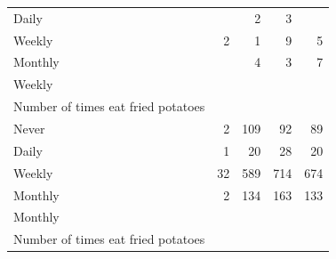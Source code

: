 \documentclass{article}
\begin{document}
\begin{table}[!h]
{\begin{tabular}{lllll}
			\multicolumn{1}{l}{\hspace{5em}Daily} &
			\multicolumn{1}{|r}{} &
			\multicolumn{1}{r}{2} &
			\multicolumn{1}{r}{3} &
			\multicolumn{1}{r}{} \\
			\multicolumn{1}{l}{\hspace{5em}Weekly} &
			\multicolumn{1}{|r}{2} &
			\multicolumn{1}{r}{1} &
			\multicolumn{1}{r}{9} &
			\multicolumn{1}{r}{5} \\
			\multicolumn{1}{l}{\hspace{5em}Monthly} &
			\multicolumn{1}{|r}{} &
			\multicolumn{1}{r}{4} &
			\multicolumn{1}{r}{3} &
			\multicolumn{1}{r}{7} \\
			\multicolumn{1}{l}{\hspace{3em}Weekly} &
			\multicolumn{1}{|r}{} &
			\multicolumn{1}{r}{} &
			\multicolumn{1}{r}{} &
			\multicolumn{1}{r}{} \\
			\multicolumn{1}{l}{\hspace{4em}Number of times eat fried potatoes} &
			\multicolumn{1}{|r}{} &
			\multicolumn{1}{r}{} &
			\multicolumn{1}{r}{} &
			\multicolumn{1}{r}{} \\
			\multicolumn{1}{l}{\hspace{5em}Never} &
			\multicolumn{1}{|r}{2} &
			\multicolumn{1}{r}{109} &
			\multicolumn{1}{r}{92} &
			\multicolumn{1}{r}{89} \\
			\multicolumn{1}{l}{\hspace{5em}Daily} &
			\multicolumn{1}{|r}{1} &
			\multicolumn{1}{r}{20} &
			\multicolumn{1}{r}{28} &
			\multicolumn{1}{r}{20} \\
			\multicolumn{1}{l}{\hspace{5em}Weekly} &
			\multicolumn{1}{|r}{32} &
			\multicolumn{1}{r}{589} &
			\multicolumn{1}{r}{714} &
			\multicolumn{1}{r}{674} \\
			\multicolumn{1}{l}{\hspace{5em}Monthly} &
			\multicolumn{1}{|r}{2} &
			\multicolumn{1}{r}{134} &
			\multicolumn{1}{r}{163} &
			\multicolumn{1}{r}{133} \\
			\multicolumn{1}{l}{\hspace{3em}Monthly} &
			\multicolumn{1}{|r}{} &
			\multicolumn{1}{r}{} &
			\multicolumn{1}{r}{} &
			\multicolumn{1}{r}{} \\
			\multicolumn{1}{l}{\hspace{4em}Number of times eat fried potatoes} &
			\multicolumn{1}{|r}{} &
			\multicolumn{1}{r}{} &
			\multicolumn{1}{r}{} &
			\multicolumn{1}{r}{} \\

\end{tabular}}
\end{table}
\end{document}
